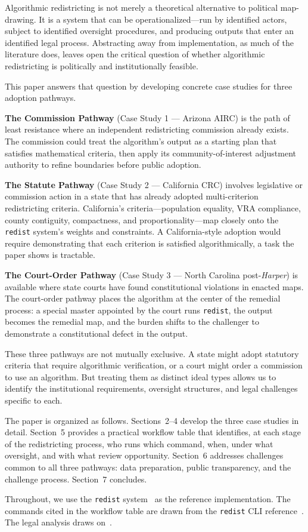 \label{sec:introduction}

Algorithmic redistricting is not merely a theoretical alternative to
political map-drawing.  It is a system that can be operationalized---run
by identified actors, subject to identified oversight procedures, and
producing outputs that enter an identified legal process.  Abstracting
away from implementation, as much of the literature does, leaves open the
critical question of whether algorithmic redistricting is politically and
institutionally feasible.

This paper answers that question by developing concrete case studies for
three adoption pathways.

\textbf{The Commission Pathway} (Case Study 1 --- Arizona AIRC) is the path
of least resistance where an independent redistricting commission already
exists.  The commission could treat the algorithm's output as a starting
plan that satisfies mathematical criteria, then apply its community-of-interest
adjustment authority to refine boundaries before public adoption.

\textbf{The Statute Pathway} (Case Study 2 --- California CRC) involves
legislative or commission action in a state that has already adopted
multi-criterion redistricting criteria.  California's criteria---population
equality, VRA compliance, county contiguity, compactness, and
proportionality---map closely onto the \texttt{redist} system's weights and
constraints.  A California-style adoption would require demonstrating that
each criterion is satisfied algorithmically, a task the paper shows is
tractable.

\textbf{The Court-Order Pathway} (Case Study 3 --- North Carolina
post-\textit{Harper}) is available where state courts have found
constitutional violations in enacted maps.  The court-order pathway places
the algorithm at the center of the remedial process: a special master
appointed by the court runs \texttt{redist}, the output becomes the
remedial map, and the burden shifts to the challenger to demonstrate a
constitutional defect in the output.

These three pathways are not mutually exclusive.  A state might adopt
statutory criteria that require algorithmic verification, or a court might
order a commission to use an algorithm.  But treating them as distinct
ideal types allows us to identify the institutional requirements, oversight
structures, and legal challenges specific to each.

The paper is organized as follows.  Sections~2--4 develop the three case
studies in detail.  Section~5 provides a practical workflow table that
identifies, at each stage of the redistricting process, who runs which
command, when, under what oversight, and with what review opportunity.
Section~6 addresses challenges common to all three pathways: data preparation,
public transparency, and the challenge process.  Section~7 concludes.

Throughout, we use the \texttt{redist} system~\citep{dellaLibera2026recursive}
as the reference implementation.  The commands cited in the workflow table
are drawn from the \texttt{redist} CLI reference~\citep{redistCliQuickstart}.
The legal analysis draws on~\citet{dellaLibera2026legal}.
